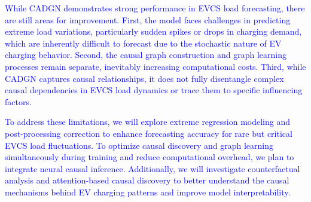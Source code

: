 \documentclass[lettersize,journal]{IEEEtran}
\newcommand{\hl}[1]{\textcolor{blue}{#1}}
\begin{document}
\hl{While CADGN demonstrates strong performance in EVCS load forecasting, there are still areas for improvement. First, the model faces challenges in predicting extreme load variations, particularly sudden spikes or drops in charging demand, which are inherently difficult to forecast due to the stochastic nature of EV charging behavior. Second, the causal graph construction and graph learning processes remain separate, inevitably increasing computational costs. Third, while CADGN captures causal relationships, it does not fully disentangle complex causal dependencies in EVCS load dynamics or trace them to specific influencing factors.}

\hl{To address these limitations, we will explore extreme regression modeling and post-processing correction to enhance forecasting accuracy for rare but critical EVCS load fluctuations. To optimize causal discovery and graph learning simultaneously during training and reduce computational overhead, we plan to integrate neural causal inference. Additionally, we will investigate counterfactual analysis and attention-based causal discovery to better understand the causal mechanisms behind EV charging patterns and improve model interpretability.}



\end{document}
